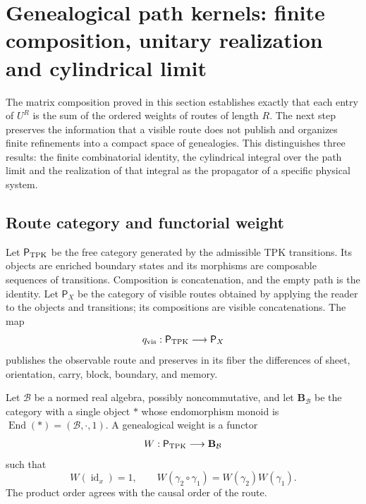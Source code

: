 \section{Genealogical path kernels: finite composition, unitary realization and cylindrical limit}
\label{x_reciprocidad:sec:integral-genealogica-caminos-rev2}

The matrix composition proved in this section establishes exactly that each entry of
\(U^R\) is the sum of the ordered weights of routes of length \(R\).
The next step preserves the information that a visible route does not publish and
organizes finite refinements into a compact space of genealogies. This
distinguishes three results: the finite combinatorial identity, the
cylindrical integral over the path limit and the realization of that
integral as the propagator of a specific physical system.

\subsection{Route category and functorial weight}

Let \(\mathsf P_{\rm TPK}\) be the free category generated by the admissible
TPK transitions. Its objects are enriched boundary states and its
morphisms are composable sequences of transitions. Composition is
concatenation, and the empty path is the identity. Let \(\mathsf P_X\)
be the category of visible routes obtained by applying the reader to the
objects and transitions; its compositions are visible concatenations.
The map
\[
 q_{\rm vis}:\mathsf P_{\rm TPK}\longrightarrow\mathsf P_X
\]
publishes the observable route and preserves in its fiber the differences of sheet,
orientation, carry, block, boundary, and memory.

\begin{definition}
\label{x_reciprocidad:def:peso-genealogico-caminos-rev2}
Let \(\mathcal B\) be a normed real algebra, possibly noncommutative, and
let \(\mathbf B_{\mathcal B}\) be the category with a single object \(\ast\) whose
endomorphism monoid is
\(\operatorname{End}(\ast)=(\mathcal B,\cdot,1)\). A genealogical weight is a functor
\[
 W:\mathsf P_{\rm TPK}\longrightarrow\mathbf B_{\mathcal B}
\]
such that
\[
 W(\operatorname{id}_x)=1,
 \qquad
 W(\gamma_2\circ\gamma_1)=W(\gamma_2)W(\gamma_1).
\]
The product order agrees with the causal order of the route.
\end{definition}

